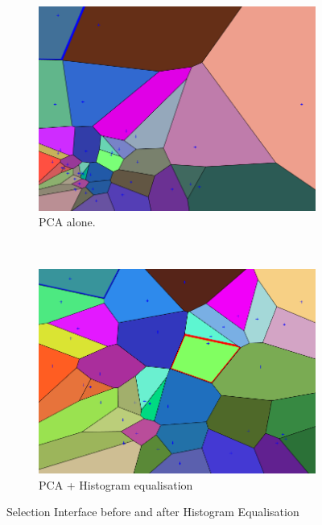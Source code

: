 \documentclass[11pt, oneside]{report}   	%
\begin{document}
\begin{figure}
	\centering
	\begin{subfigure}[b]{0.45\textwidth}
		\includegraphics[width=\textwidth]{PCAInterfaceHistEqBefore.png}
		\caption{PCA alone.}
		\label{fig:histEqBefore}
	\end{subfigure}
	~ %
	\begin{subfigure}[b]{0.45\textwidth}
		\includegraphics[width=\textwidth]{PCAInterfaceHistEqAfter.png}
		\caption{PCA + Histogram equalisation}
		\label{fig:histEqAfter}
	\end{subfigure}
	\caption{Selection Interface before and after Histogram Equalisation}\label{fig:animals}
\end{figure}
\end{document}
